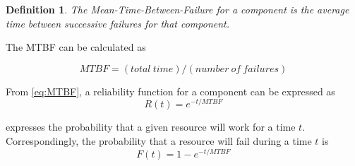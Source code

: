 \documentclass{cslthse-msc}
\newtheorem{definition}{Definition}[chapter]
\begin{document}
\begin{definition} \label{def:MTBF}
The Mean-Time-Between-Failure for a component is the average time between successive failures for that component.
\end{definition}

The MTBF can be calculated as

\begin{equation} \label{eq:MTBF}
MTBF = (total\ time) / (number\ of\ failures)
\end{equation}

From \cref{eq:MTBF}, a reliability function for a component can be expressed as 
\begin{equation} \label{eq:resource_reliability}
R(t) = e^{-t/MTBF}
\end{equation}

 expresses the probability that a given resource will work for a time $t$. Correspondingly, the probability that a resource will fail during a time $t$ is
\begin{equation} \label{eq:resource_failure_prob}
F(t) = 1- e^{-t/MTBF}
\end{equation}
\end{document}
